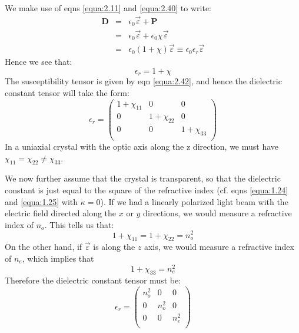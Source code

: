 \documentclass[12pt]{book}
\begin{document}
\begin{Answer}
  We make use of eqns \ref{equa:2.11} and \ref{equa:2.40} to write:
  \begin{eqnarray}
\nonumber   \mathbf{D} &=& \epsilon_0\vec{\varepsilon}+\mathbf{P} \\
\nonumber     &=&      \epsilon_0\vec{\varepsilon}+\epsilon_0\chi\vec{\varepsilon} \\
     &=& \epsilon_0(1+\chi)\vec{\varepsilon}\equiv\epsilon_0\epsilon_r\vec{\varepsilon} \label{equa:2.43} 
  \end{eqnarray}
  Hence we see that:
  \begin{equation}\label{equa:2.44}
    \epsilon_r=1+\chi
  \end{equation}
  The susceptibility tensor is given by eqn \ref{equa:2.42}, and hence the dielectric constant tensor will take the form:
\begin{equation}\label{equa:2.45}
  \epsilon_r=\left(
    \begin{array}{ccc}
      1+\chi_{11} & 0 & 0 \\
      0 & 1+\chi_{22} & 0 \\
      0 & 0 & 1+\chi_{33} \\
    \end{array}
  \right)
\end{equation}
In a uniaxial crystal with the optic axis along the z direction, we must have $\chi_{11}=\chi_{22}\ne\chi_{33}$.
  
We now further assume that the crystal is transparent, so that the dielectric constant is just equal to the square of the refractive index (cf. eqns \ref{equa:1.24} and \ref{equa:1.25} with $\kappa=0$). If we had a linearly polarized light beam with the electric field directed along the $x$ or $y$ directions, we would measure a refractive index of $n_o$. This tells us that:
\begin{equation*}
  1+\chi_{11}=1+\chi_{22}=n_o^2
\end{equation*}
On the other hand, if $\vec{\varepsilon}$ is along the $z$ axis, we would measure a refractive index of $n_e$, which implies that
\begin{equation*}
  1+\chi_{33}=n_e^2
\end{equation*}
Therefore the dielectric constant tensor must be:
\begin{equation}\label{equa:2.46}
  \epsilon_r=\left(
               \begin{array}{ccc}
                 n_o^2 & 0 & 0 \\
                 0 & n_o^2 & 0 \\
                 0 & 0 & n_e^2 \\
               \end{array}
             \right)
\end{equation}
\end{Answer}
\end{document}

